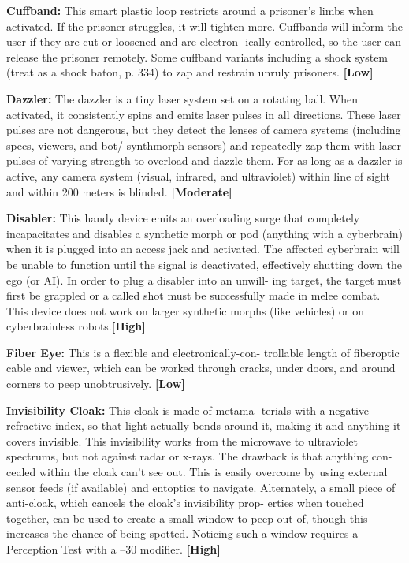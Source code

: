 \textbf{Cuffband:} This smart plastic loop restricts around 
a prisoner's limbs when activated. If the prisoner 
struggles, it will tighten more. Cuffbands will inform 
the user if they are cut or loosened and are electron-
ically-controlled, so the user can release the prisoner 
remotely. Some cuffband variants including a shock 
system (treat as a shock baton, p. 334) to zap and 
restrain unruly prisoners. \textbf{[Low]}

\textbf{Dazzler:} The dazzler is a tiny laser system set on 
a rotating ball. When activated, it consistently spins 
and emits laser pulses in all directions. These laser 
pulses are not dangerous, but they detect the lenses 
of camera systems (including specs, viewers, and bot/
synthmorph sensors) and repeatedly zap them with 
laser pulses of varying strength to overload and dazzle 
them. For as long as a dazzler is active, any camera 
system (visual, infrared, and ultraviolet) within line 
of sight and within 200 meters is blinded. \textbf{[Moderate]}

\textbf{Disabler:} This handy device emits an overloading 
surge that completely incapacitates and disables a 
synthetic morph or pod (anything with a cyberbrain) 
when it is plugged into an access jack and activated. 
The affected cyberbrain will be unable to function until 
the signal is deactivated, effectively shutting down the 
ego (or AI). In order to plug a disabler into an unwill-
ing target, the target must first be grappled or a called 
shot must be successfully made in melee combat. This 
device does not work on larger synthetic morphs (like 
vehicles) or on cyberbrainless robots.\textbf{[High]}

\textbf{Fiber Eye:} This is a flexible and electronically-con-
trollable length of fiberoptic cable and viewer, which 
can be worked through cracks, under doors, and 
around corners to peep unobtrusively. \textbf{[Low]}

\textbf{Invisibility Cloak:} This cloak is made of metama-
terials with a negative refractive index, so that light 
actually bends around it, making it and anything it 
covers invisible. This invisibility works from the 
microwave to ultraviolet spectrums, but not against 
radar or x-rays. The drawback is that anything con-
cealed within the cloak can't see out. This is easily 
overcome by using external sensor feeds (if available) 
and entoptics to navigate. Alternately, a small piece of 
anti-cloak, which cancels the cloak's invisibility prop-
erties when touched together, can be used to create a 
small window to peep out of, though this increases 
the chance of being spotted. Noticing such a window 
requires a Perception Test with a –30 modifier. \textbf{[High]}

